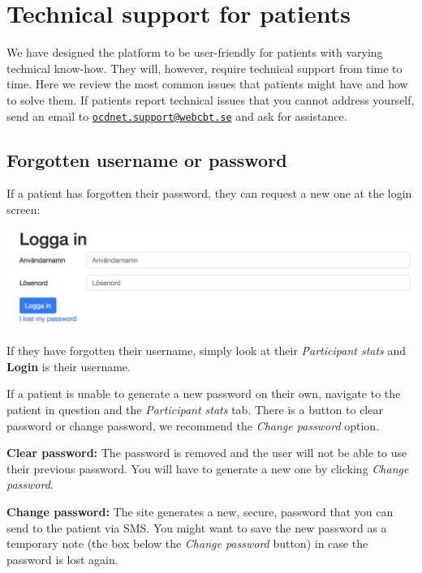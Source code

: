 \documentclass[]{book}
\theoremstyle{definition}
\theoremstyle{definition}
\theoremstyle{definition}
\theoremstyle{remark}
\begin{document}
\hypertarget{technical-support-for-patients}{%
\section{Technical support for
patients}\label{technical-support-for-patients}}

We have designed the platform to be user-friendly for patients with
varying technical know-how. They will, however, require technical
support from time to time. Here we review the most common issues that
patients might have and how to solve them. If patients report technical
issues that you cannot address yourself, send an email to
\href{mailto:ocdnet.support@webcbt.se}{\nolinkurl{ocdnet.support@webcbt.se}}
and ask for assistance.

\hypertarget{forgotten-username-or-password}{%
\subsection{Forgotten username or
password}\label{forgotten-username-or-password}}

If a patient has forgotten their password, they can request a new one at
the login screen:

\includegraphics{images/patient-lost-password.png}

If they have forgotten their username, simply look at their
\emph{Participant stats} and \textbf{Login} is their username.

If a patient is unable to generate a new password on their own, navigate
to the patient in question and the \emph{Participant stats} tab. There
is a button to clear password or change password, we recommend the
\emph{Change password} option.

\textbf{Clear password:} The password is removed and the user will not
be able to use their previous password. You will have to generate a new
one by clicking \emph{Change password}.

\textbf{Change password:} The site generates a new, secure, password
that you can send to the patient via SMS. You might want to save the new
password as a temporary note (the box below the \emph{Change password}
button) in case the password is lost again.
\end{document}
